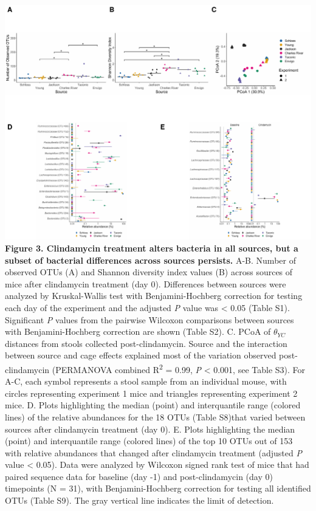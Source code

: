 \documentclass[
  11pt,
]{article}
\begin{document}
\includegraphics{figure_3.pdf} \textbf{Figure 3. Clindamycin treatment
alters bacteria in all sources, but a subset of bacterial differences
across sources persists.} A-B. Number of observed OTUs (A) and Shannon
diversity index values (B) across sources of mice after clindamycin
treatment (day 0). Differences between sources were analyzed by
Kruskal-Wallis test with Benjamini-Hochberg correction for testing each
day of the experiment and the adjusted \emph{P} value was \textless{}
0.05 (Table S1). Significant \emph{P} values from the pairwise Wilcoxon
comparisons between sources with Benjamini-Hochberg correction are shown
(Table S2). C. PCoA of \(\theta_{YC}\) distances from stools collected
post-clindamycin. Source and the interaction between source and cage
effects explained most of the variation observed post-clindamycin
(PERMANOVA combined R\textsuperscript{2} = 0.99, \emph{P} \textless{}
0.001, see Table S3). For A-C, each symbol represents a stool sample
from an individual mouse, with circles representing experiment 1 mice
and triangles representing experiment 2 mice. D. Plots highlighting the
median (point) and interquantile range (colored lines) of the relative
abundances for the 18 OTUs (Table S8)that varied between sources after
clindamycin treatment (day 0). E. Plots highlighting the median (point)
and interquantile range (colored lines) of the top 10 OTUs out of 153
with relative abundances that changed after clindamycin treatment
(adjusted \emph{P} value \textless{} 0.05). Data were analyzed by
Wilcoxon signed rank test of mice that had paired sequence data for
baseline (day -1) and post-clindamycin (day 0) timepoints (N = 31), with
Benjamini-Hochberg correction for testing all identified OTUs (Table
S9). The gray vertical line indicates the limit of detection.
\end{document}
